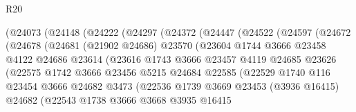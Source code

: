 \begin{lexlean}{R20}
\begin{coremodule}
                  (@24073
                    (@24148
                      (@24222
                        (@24297
                          (@24372
                            (@24447
                              (@24522
                                (@24597
                                  (@24672
                                    (@24678
                                      (@24681
                                        (@21902 @24686)
                                        @23570
                                        (@23604
                                          @1744
                                          @3666
                                          @23458
                                          @4122
                                          @24686
                                          @23614
                                          (@23616
                                            @1743
                                            @3666
                                            @23457
                                            @4119
                                            @24685
                                            @23626
                                            (@22575
                                              @1742
                                              @3666
                                              @23456
                                              @5215
                                              @24684
                                              @22585
                                              (@22529
                                                @1740
                                                @116
                                                @23454
                                                @3666
                                                @24682
                                                @3473
                                                (@22536
                                                  @1739
                                                  @3669
                                                  @23453
                                                  (@3936 @16415)
                                                  @24682
                                                  (@22543
                                                    @1738
                                                    @3666
                                                    @3668
                                                    @3935
                                                    @16415

\end{coremodule}
\end{lexlean}
